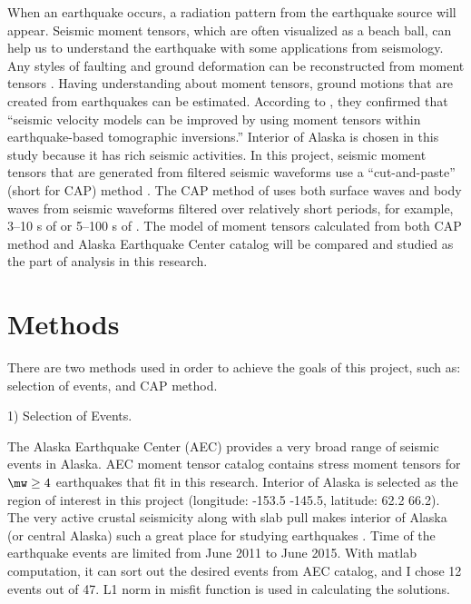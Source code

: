 \documentclass[11pt,titlepage,fleqn]{article}
\begin{document}
When an earthquake occurs, a radiation pattern from the earthquake source will appear. Seismic  moment tensors, which are often visualized as a beach ball, can help us to understand the earthquake with some applications from seismology. Any styles of faulting and ground deformation can be reconstructed from moment tensors \citep{SilwalTape2016}. Having understanding about moment tensors, ground motions that are created from earthquakes can be estimated. According to \citet{SilwalTape2016}, they confirmed that “seismic velocity models can be improved by using moment tensors within earthquake-based tomographic inversions.” Interior of Alaska is chosen in this study because it has rich seismic activities.
In this project, seismic moment tensors that  are generated from filtered seismic waveforms use a ``cut-and-paste'' (short for CAP) method \citep{ZhuHelm1996}. The CAP method of \citet{ZhuHelm1996} uses both surface waves and body waves from seismic waveforms filtered over relatively short periods, for example, 3--10 s of \citet{YTan2006} or 5--100 s of \citet{ZhuHelm1996}.
The model of moment tensors calculated from both CAP method and Alaska Earthquake Center catalog will be compared and studied as the part of analysis in this research.


\section{Methods}

There are two methods used in order to achieve the goals of this project, such as: selection of events, and CAP method. 

\vspace{2mm}

1)    Selection of Events.

\vspace{2mm}

The Alaska Earthquake Center (AEC) provides a very broad range of seismic events in Alaska. AEC moment tensor catalog contains stress moment tensors for $\mw \ge 4$ earthquakes that fit in this research. Interior of Alaska is selected as the region of interest in this project (longitude: -153.5 -145.5, latitude: 62.2 66.2). The very active crustal seismicity along with slab pull makes interior of Alaska (or central Alaska) such a great place for studying earthquakes \citet{Tape2015}. Time of the earthquake events are limited from June 2011 to June 2015. With matlab computation, it can sort out the desired events from AEC catalog, and I chose 12 events out of 47. L1 norm in misfit function is used in calculating the solutions. 
\end{document}
